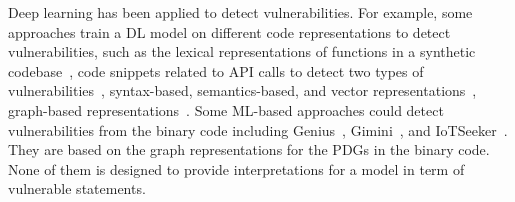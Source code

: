 Deep learning has been applied to detect
vulnerabilities.  For example, some approaches train a DL model on
different code representations to detect vulnerabilities, such as the
lexical representations of functions in a synthetic
codebase~\cite{harer2018learning}, code snippets related to
API calls to detect two types of
vulnerabilities~\cite{li2018vuldeepecker}, syntax-based,
semantics-based, and vector representations~\cite{li2018sysevr},
graph-based representations~\cite{zhou2019devign}.
Some ML-based approaches could detect vulnerabilities from the binary
code including Genius~\cite{genius16}, Gimini~\cite{gimini17}, and
IoTSeeker~\cite{iotseeker21}. They are based on the graph
representations for the PDGs in the binary code. None of them is
designed to provide interpretations for a model in term of vulnerable
statements.

